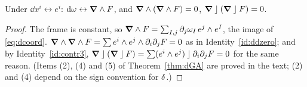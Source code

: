 \begin{identity}\label{id:dGA}
Under $\dd x^i\leftrightarrow e^i$: $\mathrm{d}\omega\leftrightarrow\boldsymbol{\nabla}\wedge F$, and $\boldsymbol{\nabla}\wedge(\boldsymbol{\nabla}\wedge F)=0$, $\boldsymbol{\nabla}\mathbin{\rfloor}(\boldsymbol{\nabla}\mathbin{\rfloor} F)=0$.
\end{identity}
\begin{proof}
 The frame is constant, so $\boldsymbol{\nabla}\wedge F=\sum_{I,j}\partial_j\omega_I\,e^j\wedge e^I$, the image of \eqref{eq:dcoord}.
 $\boldsymbol{\nabla}\wedge\boldsymbol{\nabla}\wedge F=\sum e^i\wedge e^j\wedge\partial_i\partial_jF=0$ as in Identity~\ref{id:ddzero}; and by Identity~\ref{id:contr3},
$\boldsymbol{\nabla}\mathbin{\rfloor}(\boldsymbol{\nabla}\mathbin{\rfloor} F)=\sum(e^i\wedge e^j)\mathbin{\rfloor}\partial_i\partial_jF=0$ for the same reason.
(Items (2), (4) and (5) of Theorem~\ref{thm:dGA} are proved in the text; (2) and (4) depend on the sign convention for $\delta$.)
\end{proof}
